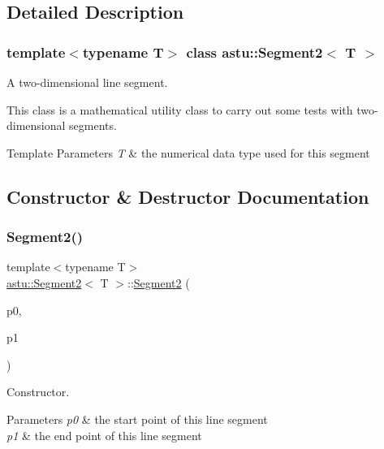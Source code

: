 \subsection{Detailed Description}
\subsubsection*{template$<$typename T$>$\newline
class astu\+::\+Segment2$<$ T $>$}

A two-\/dimensional line segment.

This class is a mathematical utility class to carry out some tests with two-\/dimensional segments.


\begin{DoxyTemplParams}{Template Parameters}
{\em T} & the numerical data type used for this segment \\
\hline
\end{DoxyTemplParams}


\subsection{Constructor \& Destructor Documentation}
\mbox{\label{classastu_1_1Segment2_a2636e676fc9c3f57d23d07759ee5c933}} 
\subsubsection{\texorpdfstring{Segment2()}{Segment2()}}
{\footnotesize\ttfamily template$<$typename T$>$ \\
\hyperlink{classastu_1_1Segment2}{astu\+::\+Segment2}$<$ T $>$\+::\hyperlink{classastu_1_1Segment2}{Segment2} (\begin{DoxyParamCaption}\item[{const \hyperlink{classastu_1_1Vector2}{Vector2}$<$ T $>$ \&}]{p0,  }\item[{const \hyperlink{classastu_1_1Vector2}{Vector2}$<$ T $>$ \&}]{p1 }\end{DoxyParamCaption})\hspace{0.3cm}{\ttfamily [inline]}}

Constructor.


\begin{DoxyParams}{Parameters}
{\em p0} & the start point of this line segment \\
\hline
{\em p1} & the end point of this line segment \\
\hline
\end{DoxyParams}


